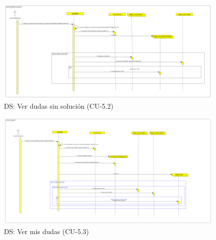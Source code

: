 \begin{figure}[H] %
\centering
\includegraphics[scale=0.17]{imagenes/diagramas/secuencia/analisis/ver_dudas_sin_solucion.png}  %

\caption{DS: Ver dudas sin solución (CU-5.2) }\label{figura83}

\end{figure}

\begin{figure}[H] %
\centering
\includegraphics[scale=0.18]{imagenes/diagramas/secuencia/analisis/ver_mis_dudas.png}  %

\caption{DS: Ver mis dudas (CU-5.3) }\label{figura84}

\end{figure}

